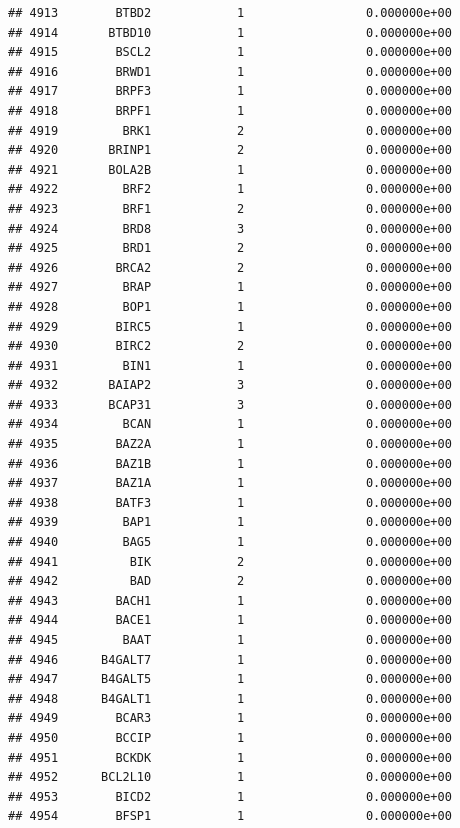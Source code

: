 \documentclass[
]{article}
\begin{document}
\begin{verbatim}
## 4913        BTBD2            1                 0.000000e+00
## 4914       BTBD10            1                 0.000000e+00
## 4915        BSCL2            1                 0.000000e+00
## 4916        BRWD1            1                 0.000000e+00
## 4917        BRPF3            1                 0.000000e+00
## 4918        BRPF1            1                 0.000000e+00
## 4919         BRK1            2                 0.000000e+00
## 4920       BRINP1            2                 0.000000e+00
## 4921       BOLA2B            1                 0.000000e+00
## 4922         BRF2            1                 0.000000e+00
## 4923         BRF1            2                 0.000000e+00
## 4924         BRD8            3                 0.000000e+00
## 4925         BRD1            2                 0.000000e+00
## 4926        BRCA2            2                 0.000000e+00
## 4927         BRAP            1                 0.000000e+00
## 4928         BOP1            1                 0.000000e+00
## 4929        BIRC5            1                 0.000000e+00
## 4930        BIRC2            2                 0.000000e+00
## 4931         BIN1            1                 0.000000e+00
## 4932       BAIAP2            3                 0.000000e+00
## 4933       BCAP31            3                 0.000000e+00
## 4934         BCAN            1                 0.000000e+00
## 4935        BAZ2A            1                 0.000000e+00
## 4936        BAZ1B            1                 0.000000e+00
## 4937        BAZ1A            1                 0.000000e+00
## 4938        BATF3            1                 0.000000e+00
## 4939         BAP1            1                 0.000000e+00
## 4940         BAG5            1                 0.000000e+00
## 4941          BIK            2                 0.000000e+00
## 4942          BAD            2                 0.000000e+00
## 4943        BACH1            1                 0.000000e+00
## 4944        BACE1            1                 0.000000e+00
## 4945         BAAT            1                 0.000000e+00
## 4946      B4GALT7            1                 0.000000e+00
## 4947      B4GALT5            1                 0.000000e+00
## 4948      B4GALT1            1                 0.000000e+00
## 4949        BCAR3            1                 0.000000e+00
## 4950        BCCIP            1                 0.000000e+00
## 4951        BCKDK            1                 0.000000e+00
## 4952      BCL2L10            1                 0.000000e+00
## 4953        BICD2            1                 0.000000e+00
## 4954        BFSP1            1                 0.000000e+00

\end{verbatim}
\end{document}
